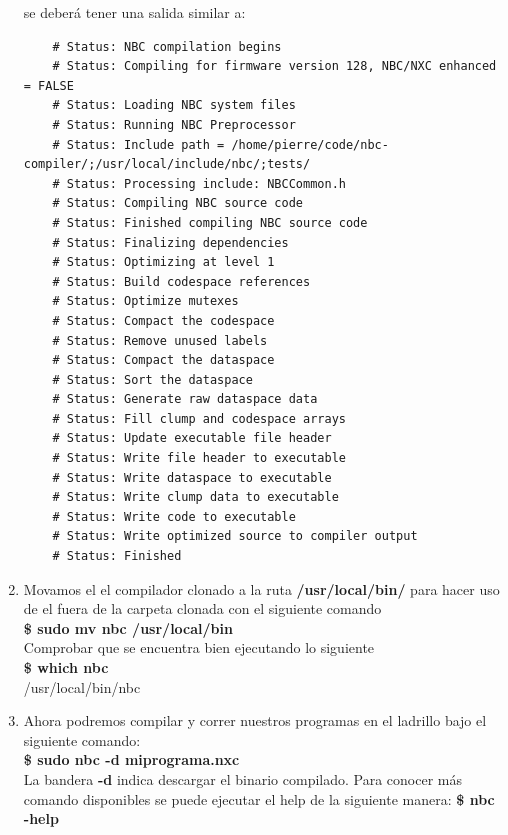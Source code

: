\documentclass[oneside,onecolumn]{article}
\begin{document}
\begin{enumerate}
  se deberá tener una salida similar a:\\

  \begin{verbatim}
    # Status: NBC compilation begins
    # Status: Compiling for firmware version 128, NBC/NXC enhanced = FALSE
    # Status: Loading NBC system files
    # Status: Running NBC Preprocessor
    # Status: Include path = /home/pierre/code/nbc-compiler/;/usr/local/include/nbc/;tests/
    # Status: Processing include: NBCCommon.h
    # Status: Compiling NBC source code
    # Status: Finished compiling NBC source code
    # Status: Finalizing dependencies
    # Status: Optimizing at level 1
    # Status: Build codespace references
    # Status: Optimize mutexes
    # Status: Compact the codespace
    # Status: Remove unused labels
    # Status: Compact the dataspace
    # Status: Sort the dataspace
    # Status: Generate raw dataspace data
    # Status: Fill clump and codespace arrays
    # Status: Update executable file header
    # Status: Write file header to executable
    # Status: Write dataspace to executable
    # Status: Write clump data to executable
    # Status: Write code to executable
    # Status: Write optimized source to compiler output
    # Status: Finished
\end{verbatim}

\item Movamos el el compilador clonado a la ruta \textbf{/usr/local/bin/} para hacer uso de el fuera de la carpeta clonada con el siguiente comando\\

  \textbf{\$ sudo mv nbc /usr/local/bin}\\

  Comprobar que se encuentra bien ejecutando lo siguiente\\

  \textbf{\$ which nbc}\\
  /usr/local/bin/nbc\\

\item Ahora podremos compilar y correr nuestros programas en el ladrillo bajo el siguiente comando:\\

  \textbf{\$ sudo nbc -d miprograma.nxc}\\

  La bandera \textbf{-d} indica descargar el binario compilado. Para conocer más comando disponibles se puede ejecutar el help de la siguiente manera: \textbf{\$ nbc -help}\\
  
\end{enumerate}
\end{document}
